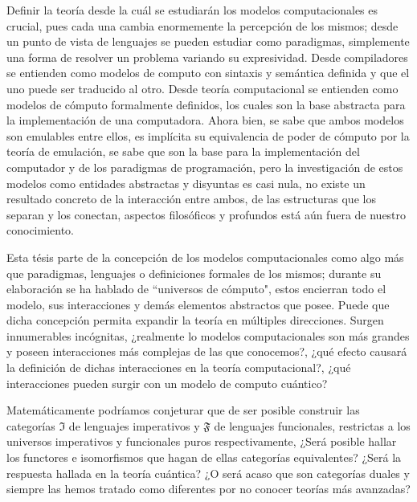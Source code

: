 \begin{conclusiones}
	Definir la teoría desde la cuál se estudiarán los modelos computacionales es crucial, pues cada una cambia enormemente la percepción de los mismos; desde un punto de vista de lenguajes se pueden estudiar como paradigmas, simplemente una forma de resolver un problema variando su expresividad. Desde compiladores se entienden como modelos de computo con sintaxis y semántica definida y que el uno puede ser traducido al otro. Desde teoría computacional se entienden como modelos de cómputo formalmente definidos, los cuales son la base abstracta para la implementación de una computadora. Ahora bien, se sabe que ambos modelos son emulables entre ellos, es implícita su equivalencia de poder de cómputo por la teoría de emulación, se sabe que son la base para la implementación del computador y de los paradigmas de programación, pero la investigación de estos modelos como entidades abstractas y disyuntas es casi nula, no existe un resultado concreto de la interacción entre ambos, de las estructuras que los separan y los conectan, aspectos filosóficos y profundos está aún fuera de nuestro conocimiento.
		
	Esta tésis parte de la concepción de los modelos computacionales como algo más que paradigmas, lenguajes o definiciones formales de los mismos; durante su elaboración se ha hablado de ``universos de cómputo", estos encierran todo el modelo, sus interacciones y demás elementos abstractos que posee. Puede que dicha concepción permita expandir la teoría en múltiples direcciones. Surgen innumerables incógnitas, ¿realmente lo modelos computacionales son más grandes y poseen interacciones más complejas de las que conocemos?, ¿qué efecto causará la definición de dichas interacciones en la teoría computacional?, ¿qué interacciones pueden surgir con un modelo de computo cuántico?
	
	Matemáticamente podríamos conjeturar que de ser posible construir las categorías 
	$\mathfrak{I}$ de lenguajes imperativos y $\mathfrak{F}$ de lenguajes funcionales, restrictas 
	a los universos imperativos y funcionales puros respectivamente, ¿Será posible hallar los 	
	functores e isomorfismos que hagan de ellas categorías equivalentes? ¿Será la respuesta hallada 
	en la teoría cuántica? ¿O será acaso que son categorías duales y siempre las hemos tratado
	como diferentes por no conocer teorías más avanzadas?
\end{conclusiones}
